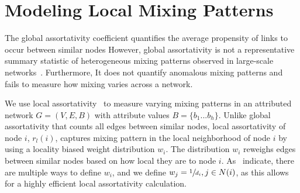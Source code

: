 \section{Modeling Local Mixing Patterns}
\label{subsec:LocalMixing}

The global assortativity coefficient quantifies
the average propensity of links to occur between similar nodes
However, global assortativity is not a representative summary statistic of heterogeneous mixing patterns observed in large-scale networks~\cite{peel2018multiscale}. Furthermore, It does not quantify anomalous mixing patterns and fails to measure how mixing varies across a network.

We use local assortativity~\cite{peel2018multiscale} to measure varying
mixing patterns in an attributed network $G=(V,E,B)$ with attribute values $B=\{b_1...b_h\}$.
Unlike global assortativity that counts all edges between similar nodes, local assortativity of node $i$, $r_l(i)$, captures mixing pattern in the local neighborhood of node $i$ by using a locality biased weight distribution $w_i$. The distribution $w_i$ reweighs edges between similar nodes based on how local they are to node $i$. As~\citet{peel2018multiscale} indicate, there are multiple ways to define $w_i$, and we define $w_j = \sfrac{1}{d_i}, j \in N(i)$, as this allows for a highly efficient local assortativity calculation.



